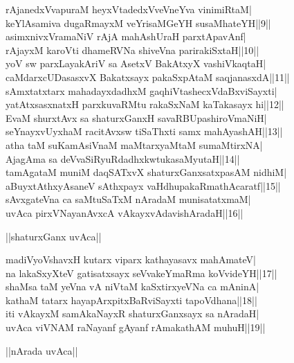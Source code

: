 \documentclass{article}
\begin{document}
rAjanedxVvapuraM heyxVtadedxVveVneYva vinimiRtaM|\\
keYlAsamiva dugaRmayxM veYrisaMGeYH susaMhateYH||9||\\
asimxnivxVramaNiV rAjA mahAshUraH parxtApavAnf|\\
rAjayxM karoVti dhameRVNa shiveVna parirakiSxtaH||10||\\
yoV sw parxLayakAriV sa AsetxV BakAtxyX vashiVkaqtaH|\\
caMdarxcUDasasxvX Bakatxsayx pakaSxpAtaM saqjanasxdA||11||\\
sAmxtatxtarx mahadayxdadhxM gaqhiVtashecxVdaBxviSayxti|\\
yatAtxsasxnatxH parxkuvaRMtu rakaSxNaM kaTakasayx hi||12||\\
EvaM shurxtAvx sa shaturxGanxH savaRBUpashiroVmaNiH|\\
seYnayxvUyxhaM racitAvxsw tiSaThxti samx mahAyashAH||13||\\
atha taM suKamAsiVnaM maMtarxyaMtaM sumaMtirxNA|\\
AjagAma sa deVvaSiRyuRdadhxkwtukasaMyutaH||14||\\
tamAgataM muniM daqSATxvX shaturxGanxsatxpasAM nidhiM|\\
aBuyxtAthxyAsaneV sAthxpayx vaHdhupakaRmathAcaratf||15||\\
sAvxgateVna ca saMtuSaTxM nAradaM munisatatxmaM|\\
uvAca pirxVNayanAvxcA vAkayxvAdavishAradaH||16||\\

\begin{center}
||shaturxGanx uvAca||
\end{center}

madiVyoVshavxH kutarx viparx kathayasavx mahAmateV|\\
na lakaSxyXteV gatisatxsayx seVvakeYmaRma koVvideYH||17||\\
shaMsa taM yeVna vA niVtaM kaSxtirxyeVNa ca mAninA|\\
kathaM tatarx hayapArxpitxBaRviSayxti tapoVdhana||18||\\
iti vAkayxM samAkaNayxR shaturxGanxsayx sa nAradaH|\\
uvAca viVNAM raNayanf gAyanf rAmakathAM muhuH||19||\\

\begin{center}
||nArada uvAca||
\end{center}
\end{document}
